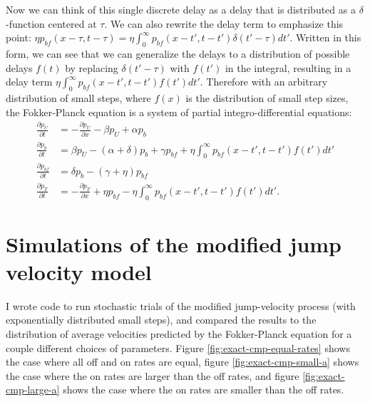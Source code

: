 \documentclass{article}
\newcommand{\dd}{d}
\newcommand{\Pder}[2]{\frac{\partial #1}{\partial #2}}
\newcommand{\Integral}[4]{\int_{#3}^{#4} {#1} \dd #2}
\begin{document}
Now we can think of this single discrete delay as a delay that is
distributed as a $\delta$-function centered at $\tau$. We can also
rewrite the delay term to emphasize this point:
$\eta p_{bf}(x - \tau, t - \tau) = \eta \Integral{p_{bf}(x - t', t - t')
  \delta(t' - \tau)}{t'}{0}{\infty}$. Written in this form, we can see
that we can generalize the delays to a distribution of possible delays
$f(t)$ by replacing $\delta(t' - \tau)$ with $f(t')$ in the integral,
resulting in a delay term $\eta \Integral{p_{bf}(x - t', t - t')
  f(t')}{t'}{0}{\infty}$. Therefore with an arbitrary distribution of
small steps, where $f(x)$ is the distribution of small step sizes, the
Fokker-Planck equation is a system of partial integro-differential
equations:
\begin{align}
  \Pder{p_U}{t} &= - \Pder{p_U}{x} - \beta p_U + \alpha
                  p_b \label{eq:nd-U-dst} \\
  \Pder{p_b}{t} &= \beta p_U - (\alpha + \delta) p_b +
                  \gamma p_{bf} + \eta \Integral{p_{bf}(x - t', t -
                  t') f(t')} {t'} {0} {\infty} \label{eq:nd-B-dst} \\
  \Pder{p_{bf}}{t} &= \delta p_b - (\gamma + \eta)
                     p_{bf} \label{eq:nd-BF-dst} \\
  \Pder{p_T}{t} &= -\Pder{p_T}{x} + \eta p_{bf} - \eta
                  \Integral{p_{bf}(x - t', t - t') f(t')} {t'} {0}
                  {\infty}. \label{eq:nd-T-dst}
\end{align}

\section{Simulations of the modified jump velocity model}
\label{sec:simul-modif-jump}

I wrote code to run stochastic trials of the modified jump-velocity
process (with exponentially distributed small steps), and compared the
results to the distribution of average velocities predicted by the
Fokker-Planck equation for a couple different choices of
parameters. Figure \ref{fig:exact-cmp-equal-rates} shows the case
where all off and on rates are equal, figure
\ref{fig:exact-cmp-small-a} shows the case where the on rates are
larger than the off rates, and figure \ref{fig:exact-cmp-large-a}
shows the case where the on rates are smaller than the off rates.
\end{document}
